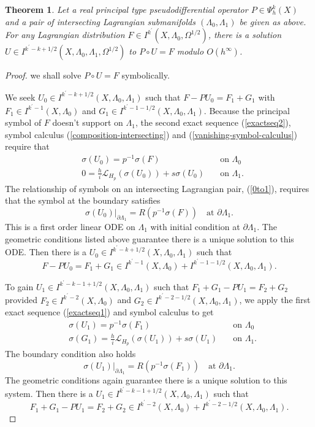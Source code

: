 \documentclass[10pt, a4paper, twoside]{amsart}
\numberwithin{equation}{section}
\newtheorem{theorem}{Theorem}
\theoremstyle{remark}
\begin{document}
\begin{appendix}
	
	\begin{theorem}\label{parametrix construction intersecting}Let a real principal type  pseudodifferential operator $P \in \Psi^k_h(X)$ and a pair of intersecting Lagrangian 
	submanifolds $(\Lambda_0, \Lambda_1)$ be given as above. For any Lagrangian distribution $F \in I^{k^\prime}(X, \Lambda_0, \Omega^{1/2})$, there is a solution $U \in I^{k^\prime - k + 1/2} (X, \Lambda_0, \Lambda_1,  \Omega^{1/2})$ to $P \circ U = F$ modulo $O(h^\infty)$.\end{theorem}
	
	\begin{proof} we shall solve $P \circ U = F$ symbolically.
	
	We seek $U_0 \in I^{k^\prime - k + 1/2} (X, \Lambda_0, \Lambda_1)$ such that $F - P U_0 = F_1 + G_1$ with  $F_1 \in I^{k^\prime - 1}(X, \Lambda_0)$   and $G_1 \in I^{k^\prime - 1 - 1/2}(X, \Lambda_0, \Lambda_1)$. Because the principal symbol of $F$ doesn't support on $\Lambda_1$, the second exact sequence (\ref{exactseq2}), symbol calculus (\ref{composition-intersecting}) and (\ref{vanishing-symbol-calculus}) require that 
	\begin{eqnarray*}&\sigma(U_0) = p^{-1} \sigma(F) &\quad\mbox{on $\Lambda_0$}\\ &0 = \frac{h}{i} \mathcal{L}_{H_{p}} (\sigma(U_0)) + s \sigma(U_0)  &\quad\mbox{on $\Lambda_1$}.
	\end{eqnarray*}  
	The relationship of symbols on an intersecting Lagrangian pair, (\ref{0to1}), requires that  the symbol at the boundary satisfies $$\sigma(U_0)|_{\partial \Lambda_1} = R(p^{-1} \sigma(F)) \quad\mbox{at $\partial \Lambda_1$}.$$
	This is a first order linear ODE on $\Lambda_1$ with initial condition at $\partial \Lambda_1$. 
	The geometric conditions listed above guarantee there is a unique solution to this ODE. Then there is a $U_0  \in I^{k^\prime - k + 1/2} (X, \Lambda_0, \Lambda_1)$ such that $$F - PU_0 = F_1 + G_1 \in I^{k^\prime - 1}(X, \Lambda_0) + I^{k^\prime - 1 - 1/2} (X, \Lambda_0, \Lambda_1).$$
	
	To gain $U_1 \in I^{k^\prime - k - 1 + 1/2} (X, \Lambda_0, \Lambda_1)$ such that $F_1 + G_1 - P U_1 = F_2 + G_2$ provided  $F_2 \in I^{k^\prime - 2}(X, \Lambda_0)$  and $G_2 \in I^{k^\prime - 2 - 1/2}(X, \Lambda_0, \Lambda_1)$,  we apply the first exact sequence (\ref{exactseq1}) and symbol calculus to get \begin{eqnarray*}&\sigma(U_1) = p^{-1} \sigma(F_1) &\quad\mbox{on $\Lambda_0$}\\ &\sigma(G_1) = \frac{h}{i} \mathcal{L}_{H_{p}} (\sigma(U_1)) + s \sigma(U_1)  &\quad\mbox{on $\Lambda_1$}.\end{eqnarray*} The boundary condition also holds $$\sigma(U_1)|_{\partial \Lambda_1} = R(p^{-1} \sigma(F_1)) \quad\mbox{at $\partial \Lambda_1$}.$$The geometric conditions again guarantee there is a unique solution to this system. Then there is a $U_1  \in I^{k^\prime - k - 1 + 1/2} (X, \Lambda_0, \Lambda_1)$ such that $$ F_1 + G_1 - PU_1= F_2 + G_2 \in I^{k^\prime - 2}(X, \Lambda_0) + I^{k^\prime - 2 - 1/2} (X, \Lambda_0, \Lambda_1).$$
	

\end{proof}
\end{appendix}
\end{document}

